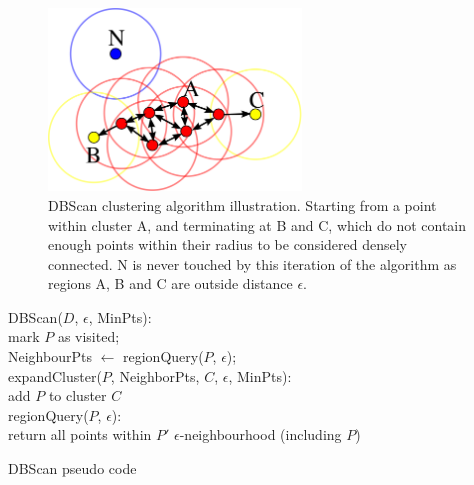 \documentclass[]{article}
\begin{document}
{\begin{figure}[bt]
	\begin{center}
		\includegraphics[width=0.6\textwidth]{2000px-DBSCAN-Illustration.png}
	\end{center}
	\caption{DBScan clustering algorithm illustration. Starting from a point within cluster A, and terminating at B and C, which do not contain enough points within their radius to be considered densely connected. N is never touched by this iteration of the algorithm as regions A, B and C are outside distance $\epsilon$.}
	\label{fig:dbscan}

\end{figure}

\begin{algorithm}[tb]
	\SetAlgoLined
	\bigskip
	DBScan($D$, $\epsilon$, MinPts): \\
	{
		mark $P$ as visited; \\
		NeighbourPts $\leftarrow$ regionQuery($P$, $\epsilon$); \\
	}
	\bigskip
	expandCluster($P$, NeighborPts, $C$, $\epsilon$, MinPts):  \\
	add $P$ to cluster $C$ \\
	\bigskip
	regionQuery($P$, $\epsilon$):  \\
	{
 		return all points within $P'$ $\epsilon$-neighbourhood (including $P$)
	}
	\bigskip
	\caption{DBScan pseudo code}
	\label{alg:dbscan}
\end{algorithm}

}
\end{document}
